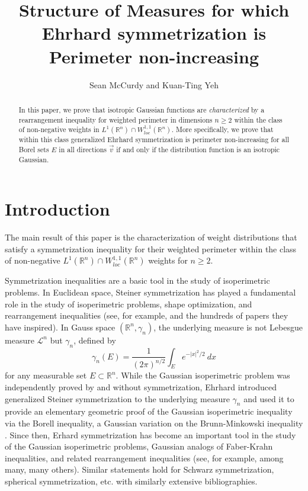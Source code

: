 \documentclass[12pt]{amsart}
\title{Structure of Measures for which Ehrhard symmetrization is Perimeter non-increasing}
\author{Sean McCurdy and Kuan-Ting Yeh}
\numberwithin{equation}{section}
\theoremstyle{plain}
\theoremstyle{definition}
\begin{document}
\maketitle

\begin{abstract}  
In this paper, we prove that isotropic Gaussian functions are \textit{characterized} by a rearrangement inequality for weighted perimeter in dimensions $n \ge 2$ within the class of non-negative weights in $L^1(\mathbb{R}^n) \cap W^{1,1}_{loc}(\mathbb{R}^n)$.  More specifically, we prove that within this class generalized Ehrhard symmetrization is perimeter non-increasing for all Borel sets $E$ in all directions $\vec{v}$ if and only if the distribution function is an isotropic Gaussian.
\end{abstract}

\tableofcontents

\section{Introduction}

The main result of this paper is the characterization of weight distributions that satisfy a symmetrization inequality for their weighted perimeter within the class of non-negative $L^1(\mathbb{R}^n) \cap W^{1, 1}_{loc}(\mathbb{R}^n)$ weights for $n \ge 2$.  

Symmetrization inequalities are a basic tool in the study of isoperimetric problems. In Euclidean space, Steiner symmetrization has played a fundamental role in the study of isoperimetric problems, shape optimization, and rearrangement inequalities  (see, for example, \cite{Steiner1838}\cite{Chlebk2005ThePI}\cite{Krahn25}\cite{PolyaSzego51}\cite{Talenti76} and the hundreds of papers they have inspired).  In Gauss space $(\mathbb{R}^n, \gamma_n)$, the underlying measure is not Lebesgue measure $\mathscr{L}^n$ but $\gamma_n$, defined by 
$$\gamma_n(E)=\frac{1}{(2\pi)^{n/2}}\int_Ee^{-|x|^2/2}\ dx$$
for any measurable set $E\subset \mathbb{R}^n$.
While the Gaussian isoperimetric problem was independently proved by \cite{Borell75_Gaussisoperi} and \cite{CirelsonSudakov74_Gisoperi} without symmetrization, Ehrhard introduced generalized Steiner symmetrization to the underlying measure $\gamma_n$ and used it to provide an elementary geometric proof of the Gaussian isoperimetric inequality via the Borell inequality, a Gaussian variation on the Brunn-Minkowski inequality \cite{Ehrhard82,Ehrhard83,Ehrhard84}. Since then, Erhard symmetrization has become an important tool in the study of the Gaussian isoperimetric problems, Gaussian analogs of Faber-Krahn inequalities, and related rearrangement inequalities (see, for example, \cite{Ehrhard84}\cite{CianchiFuscoMaggiPratelli11}\cite{CarlenKerce01}\cite{BrockChiacchioMercaldo12} among many, many others). Similar statements hold for Schwarz symmetrization, spherical symmetrization, etc. with similarly extensive bibliographies.
\end{document}
